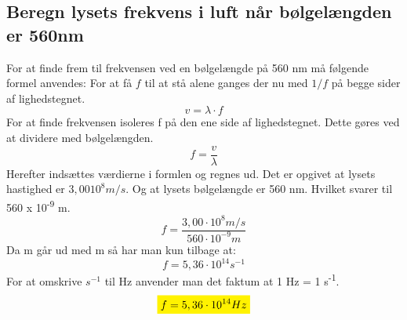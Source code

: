 \subsection{Beregn lysets frekvens i luft når bølgelængden er 560nm}
For at finde frem til frekvensen ved en bølgelængde på 560 nm må følgende formel anvendes:
For at få \begin{math}f\end{math} til at stå alene ganges der nu med \begin{math}1/f\end{math} på begge sider af lighedstegnet. 
\begin{equation*}
    v=\lambda \cdot f
\end{equation*}
For at finde frekvensen isoleres f på den ene side af lighedstegnet. Dette gøres ved at dividere med bølgelængden.
\begin{equation*}
    f=\frac{v}{\lambda}
\end{equation*}
Herefter indsættes værdierne i formlen og regnes ud. Det er opgivet at lysets hastighed er \begin{math}3,00 10^{8} m/s\end{math}. Og at lysets bølgelængde er 560 nm. Hvilket svarer til 560 x 10\textsuperscript{-9} m.
\begin{equation*}
    f=\frac{3,00 \cdot 10^{8} m/s}{560 \cdot 10^{-9} m}
\end{equation*}
Da m går ud med m så har man kun tilbage at:
\begin{equation*}
    f=5,36 \cdot 10^{14} s^{-1}
\end{equation*}
For at omskrive \begin{math}s^{-1}\end{math} til Hz anvender man det faktum at 1 Hz = 1 s\textsuperscript{-1}.
\textbf{\begin{equation*}
    \mathcolorbox{yellow}{f=5,36 \cdot 10^{14} Hz}
\end{equation*}}
